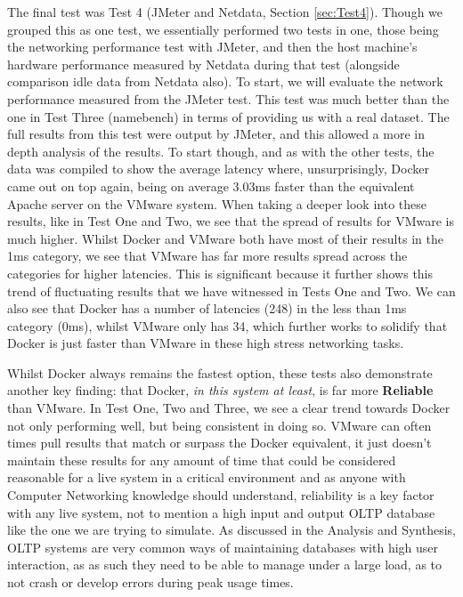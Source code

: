 The final test was Test 4 (JMeter and Netdata, Section \ref{sec:Test4}). Though we grouped this as one test, we essentially performed two tests in one, those being the networking performance test with JMeter, and then the host machine's hardware performance measured by Netdata during that test (alongside comparison idle data from Netdata also). To start, we will evaluate the network performance measured from the JMeter test. This test was much better than the one in Test Three (namebench) in terms of providing us with a real dataset. The full results from this test were output by JMeter, and this allowed a more in depth analysis of the results. To start though, and as with the other tests, the data was compiled to show the average latency where, unsurprisingly, Docker came out on top again, being on average  3.03ms faster than the equivalent Apache server on the VMware system. When taking a deeper look into these results, like in Test One and Two, we see that the spread of results for VMware is much higher. Whilst Docker and VMware both have most of their results in the 1ms category, we see that VMware has far more results spread across the categories for higher latencies. This is significant because it further shows this trend of fluctuating results that we have witnessed in Tests One and Two. We can also see that Docker has a number of latencies (248) in the less than 1ms category (0ms), whilst VMware only has 34, which further works to solidify that Docker is just faster than VMware in these high stress networking tasks.

Whilst Docker always remains the fastest option, these tests also demonstrate another key finding: that Docker, \emph{in this system at least}, is far more \textbf{Reliable} than VMware. In Test One, Two and Three, we see a clear trend towards Docker not only performing well, but being consistent in doing so. VMware can often times pull results that match or surpass the Docker equivalent, it just doesn't maintain these results for any amount of time that could be considered reasonable for a live system in a critical environment and as anyone with Computer Networking knowledge should understand, reliability is a key factor with any live system, not to mention a high input and output OLTP database like the one we are trying to simulate. As discussed in the Analysis and Synthesis, OLTP systems are very common ways of maintaining databases with high user interaction, as as such they need to be able to manage under a large load, as to not crash or develop errors during peak usage times.

